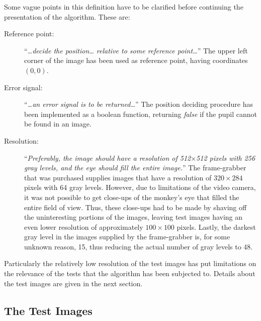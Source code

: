 \noindent Some vague points in this definition have to be clarified
before continuing the presentation of the algorithm.  These are:
\begin{description}
\item[Reference point:] ``{\em\ldots decide the position\ldots
    relative to some reference point\ldots\/}'' The upper left corner
  of the image has been used as reference point, having coordinates
  $(0,0)$.
\item[Error signal:] ``{\em\ldots an error signal is to be
    returned\ldots\/}'' The position deciding procedure has been
  implemented as a boolean function, returning {\em false\/} if the
  pupil cannot be found in an image.
\item[Resolution:] ``{\em Preferably, the image should have a
    resolution of 512$\times$512 pixels with 256 gray levels, and the
    eye should fill the entire image.\/}'' The frame-grabber that was
  purchased supplies images that have a resolution of $320\times 284$
  pixels with 64 gray levels.  However, due to limitations of the
  video camera, it was not possible to get close-ups of the monkey's
  eye that filled the entire field of view.  Thus, these close-ups had
  to be made by shaving off the uninteresting portions of the images,
  leaving test images having an even lower resolution of approximately
  $100\times 100$ pixels.  Lastly, the darkest gray level in the
  images supplied by the frame-grabber is, for some unknown reason,
  15, thus reducing the actual number of gray levels to 48.
\end{description}
Particularly the relatively low resolution of the test images has
put limitations on the relevance of the tests that the algorithm has
been subjected to.  Details about the test images are given in the
next section.

\subsection{The Test Images}
\label{algo:intro:images}

